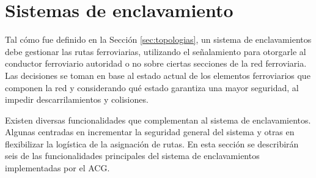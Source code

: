 \section{Sistemas de enclavamiento}
	\label{sec:interlockingTheory}
	
	Tal cómo fue definido en la Sección \ref{sec:topologias}, un sistema de enclavamientos debe gestionar las rutas ferroviarias, utilizando el señalamiento para otorgarle al conductor ferroviario autoridad o no sobre ciertas secciones de la red ferroviaria. Las decisiones se toman en base al estado actual de los elementos ferroviarios que componen la red y considerando qué estado garantiza una mayor seguridad, al impedir descarrilamientos y colisiones.
	
	Existen diversas funcionalidades que complementan al sistema de enclavamientos. Algunas centradas en incrementar la seguridad general del sistema y otras en flexibilizar la logística de la asignación de rutas. En esta sección se describirán seis de las funcionalidades principales del sistema de enclavamientos implementadas por el ACG.
	
	
	
	
	
	
	